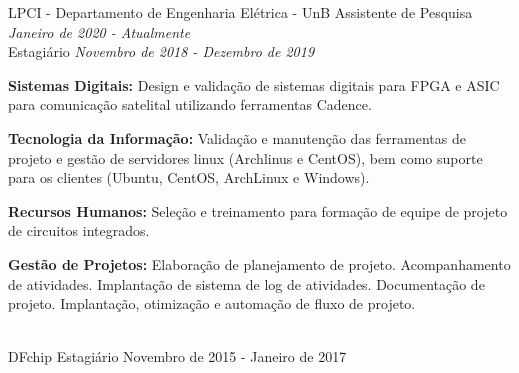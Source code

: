 \documentclass[a4paper]{twentysecondcv} %
\begin{document}
\begin{twenty} %
\twentyitem
    	{LPCI - Departamento de Engenharia Elétrica - UnB}
		{Assistente de Pesquisa \hfill \textit{Janeiro de 2020 - Atualmente}\\}
        {Estagiário \hfill\textit{Novembro de 2018 - Dezembro de 2019}}
        {
            \color{pblue}{\hspace{8pt}-\hspace{4pt}} \color{black}\textbf{Sistemas
            Digitais: }Design e validação de sistemas digitais para FPGA e     
            ASIC para comunicação satelital utilizando ferramentas Cadence.
            
            \color{pblue}{\hspace{8pt}-\hspace{4pt}} \color{black}\textbf{
            Tecnologia da Informação: }Validação e manutenção das ferramentas de 
            projeto e gestão de servidores linux (Archlinus e CentOS), bem como 
            suporte para os clientes (Ubuntu, CentOS, ArchLinux e Windows).
            
            \color{pblue}{\hspace{8pt}-\hspace{4pt}} \color{black}\textbf{Recursos 
            Humanos: }Seleção e treinamento para formação de equipe de projeto de
            circuitos integrados.
            
            \color{pblue}{\hspace{8pt}-\hspace{4pt}} \color{black}\textbf{Gestão
            de Projetos: }Elaboração de planejamento de projeto. Acompanhamento de
            atividades. Implantação de sistema de log de atividades. Documentação
            de projeto. Implantação, otimização e automação de fluxo de projeto.

        }
        \\
	\twentyitem
    	{DFchip}
		{Estagiário}
        {Novembro de 2015 - Janeiro de 2017}
        {
            \color{pblue}{\hspace{8pt}-\hspace{4pt}} 
            
            \color{pblue}{\hspace{8pt}-\hspace{4pt}} 
            
}
\end{twenty}
\end{document}
